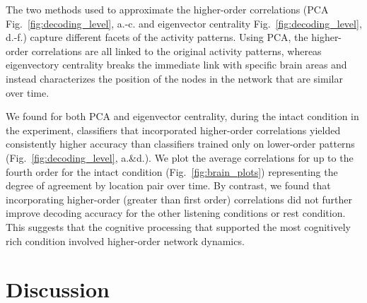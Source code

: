 \documentclass[english]{article}
\begin{document}
The two methods used to approximate the higher-order correlations (PCA Fig.~\ref{fig:decoding_level},  a.-c. and eigenvector
centrality Fig.~\ref{fig:decoding_level},  d.-f.) capture different
facets of the activity patterns.  Using PCA, the higher-order
correlations are all linked to the original activity patterns, whereas
eigenvectory centrality breaks the immediate link with specific brain
areas and instead characterizes the position of the nodes in the
network that are similar over time.

We found for both PCA and eigenvector centrality, during the intact
condition in the experiment, classifiers that incorporated
higher-order correlations yielded consistently higher accuracy than
classifiers trained only on lower-order patterns
(Fig.~\ref{fig:decoding_level}, a.\&d.).  We plot the average
correlations for up to the fourth order for the intact condition
(Fig.~\ref{fig:brain_plots}) representing the degree of agreement by
location pair over time.  By contrast, we found that incorporating
higher-order (greater than first order) correlations did not further
improve decoding accuracy for the other listening conditions or rest
condition.  This suggests that the cognitive processing that supported
the most cognitively rich condition involved higher-order network
dynamics.




\section*{Discussion}
\end{document}
